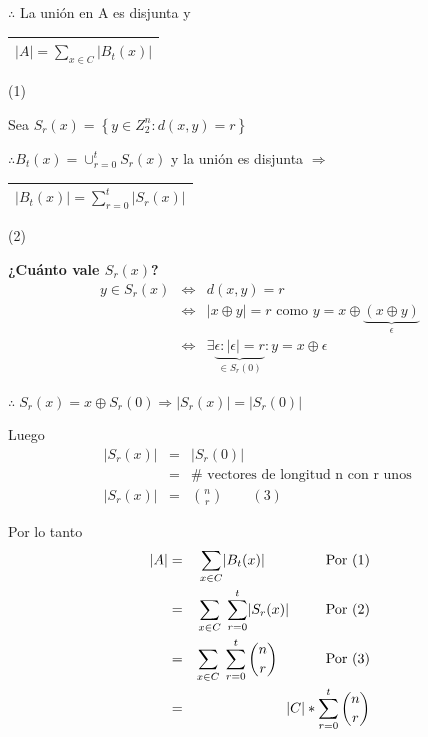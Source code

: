\documentclass[12pt,a4paper]{report}
\begin{document}
			\begin{center}
				$\therefore$ La unión en A es disjunta y \begin{tabular}{|c|} \hline $ \lvert A \rvert = \sum_{x \in C} \lvert B_{t}(x) \rvert $ \\ \hline \end{tabular} (1)
			\end{center}

			\vspace{3mm}
			\par Sea $S_{r}(x) = \left\lbrace y \in Z_{2}^{n} : d(x, y) = r \right\rbrace$

			\vspace{3mm}
			\par $\therefore B_{t}(x) = \cup_{r = 0}^{t}S_{r}(x)$ y la unión es disjunta $\Rightarrow$ \begin{tabular}{|c|} \hline $ \lvert B_{t}(x) \rvert = \sum_{r = 0}^{t}\lvert S_{r}(x) \rvert$ \\ \hline \end{tabular} (2)

			\vspace{3mm}
			\textbf{¿Cuánto vale $S_{r}(x)$?}
			\begin{eqnarray}
				\nonumber y \in S_{r}(x) & \Leftrightarrow & d(x, y) = r \\
				\nonumber & \Leftrightarrow & \lvert x \oplus y \rvert = r \text{ como } y = x \oplus \underbrace{(x \oplus y)}_{\epsilon} \\
				\nonumber & \Leftrightarrow & \exists \underbrace{\epsilon : \lvert \epsilon\rvert = r}_{\in S_{r}(0)} : y = x \oplus \epsilon
			\end{eqnarray}
			\par $\therefore \; S_{r}(x) = x \oplus S_{r}(0) \Rightarrow \lvert S_{r}(x)\rvert = \lvert S_{r}(0)\rvert $

			\vspace{3mm}
			\par Luego
			\begin{eqnarray}
				\nonumber \lvert S_{r}(x)\rvert &=& \lvert S_{r}(0)\rvert \\
				\nonumber &=& \# \text{ vectores de longitud n con r unos } \\
				\nonumber \lvert S_{r}(x)\rvert &=& {n \choose r} \qquad (3)
			\end{eqnarray}

			\par Por lo tanto
			\begin{eqnarray}
				\nonumber \lvert A\rvert &=& \sum_{x \in C} \lvert B_{t}(x)\rvert \qquad \qquad \textup{ Por (1)} \\
				\nonumber &=& \sum_{x \in C} \; \sum_{r= 0}^{t} \lvert S_{r}(x) \rvert \; \qquad \textup{ Por (2)} \\
				\nonumber &=& \sum_{x \in C} \; \sum_{r = 0}^{t} {n \choose r} \qquad \; \; \; \;\textup{ Por (3)} \\
				\nonumber &=& \lvert C \rvert * \sum_{r = 0}^{t} {n \choose r}
			\end{eqnarray}
\end{document}
